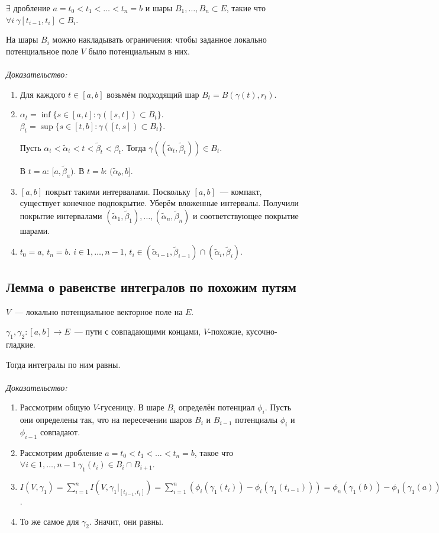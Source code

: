 \documentclass[paper=a4, fontsize=11pt]{article}
\begin{document}
$\exists$ дробление $a=t_0<t_1<\dots<t_n = b$ и шары $B_1,\dots,B_n \subset E$, такие что
$\forall i\ \gamma[t_{i-1},t_i] \subset B_i$.

На шары $B_i$ можно накладывать ограничения: чтобы заданное локально потенциальное поле $V$ было потенциальным в них.
\\\\
\emph{Доказательство:}
\begin{enumerate}
    \item Для каждого $t \in [a,b]$ возьмём подходящий шар $B_t = B(\gamma(t),r_t)$.
    \item
    $\alpha_t = \inf \{s \in [a,t]: \gamma([s,t]) \subset B_t\}$.\\
    $\beta_t = \sup \{s \in [t,b]: \gamma([t,s]) \subset B_t\}$.

    Пусть $\alpha_t < \widetilde{\alpha}_t < t < \widetilde{\beta}_t < \beta_t$.
    Тогда $\gamma((\widetilde{\alpha}_t, \widetilde{\beta}_t)) \in B_t$.

    В $t=a$: $[a,\widetilde{\beta}_a)$.
    В $t=b$: $(\widetilde{\alpha}_b,b]$.
    \item $[a,b]$ покрыт такими интервалами. Поскольку $[a,b]$~--- компакт, существует конечное подпокрытие. Уберём вложенные интервалы.
    Получили покрытие интервалами $(\widetilde{\alpha}_1, \widetilde{\beta}_1), \dots, (\widetilde{\alpha}_n, \widetilde{\beta}_n)$
    и соответствующее покрытие шарами.
    \item $t_0 = a$, $t_n = b$. $i \in {1,\dots,n-1}$,
    $t_i \in (\widetilde{\alpha}_{i-1}, \widetilde{\beta}_{i-1}) \cap (\widetilde{\alpha}_i, \widetilde{\beta}_i)$.
\end{enumerate}

\subsection{Лемма о равенстве интегралов по похожим путям}
$V$~--- локально потенциальное векторное поле на $E$.

$\gamma_1,\gamma_2: [a,b] \rightarrow E$~--- пути с совпадающими концами, $V$-похожие, кусочно-гладкие.

Тогда интегралы по ним равны.
\\\\
\emph{Доказательство:}
\begin{enumerate}
    \item Рассмотрим общую $V$-гусеницу. В шаре $B_i$ определён потенциал $\phi_i$. Пусть они определены так, что
    на пересечении шаров $B_i$ и $B_{i-1}$ потенциалы $\phi_i$ и $\phi_{i-1}$ совпадают.
    \item Рассмотрим дробление $a=t_0<t_1<\dots<t_n=b$, такое что $\forall i \in {1,\dots,n-1}\ \gamma_1(t_i) \in B_i \cap B_{i+1}$.
    \item $I(V,\gamma_1) = \sum_{i=1}^n I(V,\gamma_1 |_{[t_{i-1},t_i]}) =
    \sum_{i=1}^n (\phi_i(\gamma_1(t_i)) - \phi_i(\gamma_1(t_{i-1}))) = \phi_n(\gamma_1(b)) - \phi_1(\gamma_1(a))$.
    \item То же самое для $\gamma_2$. Значит, они равны.
\end{enumerate}
\end{document}
